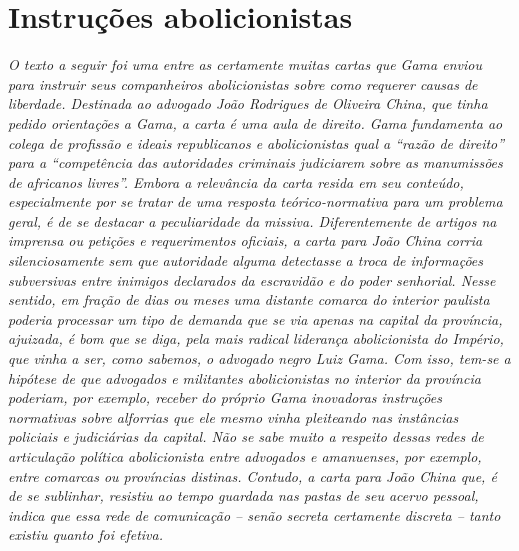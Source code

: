 
\part{Instruções abolicionistas}

\begin{argumento}
\emph{O texto a seguir foi uma entre as certamente muitas cartas que
Gama enviou para instruir seus companheiros abolicionistas sobre como
requerer causas de liberdade. Destinada ao advogado João Rodrigues de
Oliveira China, que tinha pedido orientações a Gama, a carta é uma aula
de direito. Gama fundamenta ao colega de profissão e ideais republicanos
e abolicionistas qual a ``razão de direito'' para a ``competência das
autoridades criminais judiciarem sobre as manumissões de africanos
livres''. Embora a relevância da carta resida em seu conteúdo,
especialmente por se tratar de uma resposta teórico-normativa para um
problema geral, é de se destacar a peculiaridade da missiva.
Diferentemente de artigos na imprensa ou petições e requerimentos
oficiais, a carta para João China corria silenciosamente sem que
autoridade alguma detectasse a troca de informações subversivas entre
inimigos declarados da escravidão e do poder senhorial. Nesse sentido,
em fração de dias ou meses uma distante comarca do interior paulista
poderia processar um tipo de demanda que se via apenas na capital da
província, ajuizada, é bom que se diga, pela mais radical liderança
abolicionista do Império, que vinha a ser, como sabemos, o advogado
negro Luiz Gama. Com isso, tem-se a hipótese de que advogados e
militantes abolicionistas no interior da província poderiam, por
exemplo, receber do próprio Gama inovadoras instruções normativas sobre
alforrias que ele mesmo vinha pleiteando nas instâncias policiais e
judiciárias da capital. Não se sabe muito a respeito dessas redes de
articulação política abolicionista entre advogados e amanuenses, por
exemplo, entre comarcas ou províncias distinas. Contudo, a carta para
João China que, é de se sublinhar, resistiu ao tempo guardada nas pastas
de seu acervo pessoal, indica que essa rede de comunicação -- senão
secreta certamente discreta -- tanto existiu quanto foi efetiva.}
\end{argumento}

